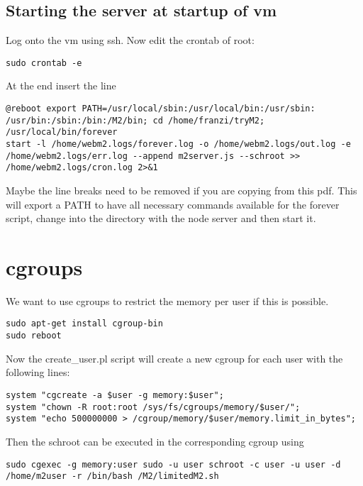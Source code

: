 \documentclass[a4paper]{book}
\begin{document}
\section{Starting the server at startup of vm}
Log onto the vm using ssh. Now edit the crontab of root:
\begin{verbatim}
sudo crontab -e
\end{verbatim}
At the end insert the line
\begin{verbatim}
@reboot export PATH=/usr/local/sbin:/usr/local/bin:/usr/sbin:
/usr/bin:/sbin:/bin:/M2/bin; cd /home/franzi/tryM2; /usr/local/bin/forever
start -l /home/webm2.logs/forever.log -o /home/webm2.logs/out.log -e
/home/webm2.logs/err.log --append m2server.js --schroot >>
/home/webm2.logs/cron.log 2>&1
\end{verbatim}
Maybe the line breaks need to be removed if you are copying from this pdf.
This will export a PATH to have all necessary commands available for the forever script, change into the directory with the node server and then start it.


\chapter{cgroups}
We want to use cgroups to restrict the memory per user if this is possible.
\begin{verbatim}
sudo apt-get install cgroup-bin 
sudo reboot
\end{verbatim}

Now the create\_user.pl script will create a new cgroup for each user with the following lines:
\begin{verbatim}
system "cgcreate -a $user -g memory:$user";
system "chown -R root:root /sys/fs/cgroups/memory/$user/";
system "echo 500000000 > /cgroup/memory/$user/memory.limit_in_bytes";
\end{verbatim}

Then the schroot can be executed in the corresponding cgroup using
\begin{verbatim}
sudo cgexec -g memory:user sudo -u user schroot -c user -u user -d /home/m2user -r /bin/bash /M2/limitedM2.sh
\end{verbatim}
\end{document}
